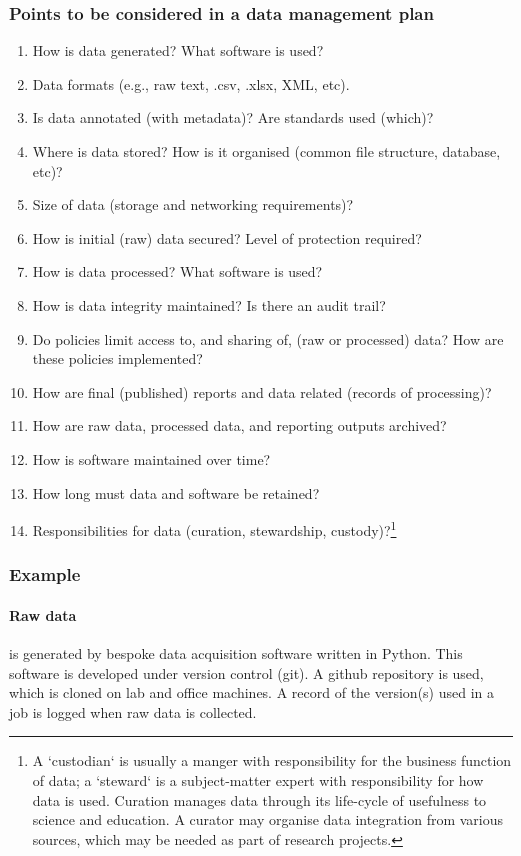 \subsubsection{Points to be considered in a data management plan}
\begin{enumerate}
 \item How is data generated? What software is used? 
 \item Data formats (e.g., raw text, .csv, .xlsx, XML, etc). 
 \item Is data annotated (with metadata)? Are standards used (which)? 
 \item Where is data stored? How is it organised (common file structure, database, etc)? 
 \item Size of data (storage and networking requirements)? 
 \item How is initial (raw) data secured? Level of protection required? 
 \item How is data processed? What software is used? 
 \item How is data integrity maintained? Is there an audit trail?
 \item Do policies limit access to, and sharing of, (raw or processed) data? How are these policies implemented?
 \item How are final (published) reports and data related (records of processing)?
 \item How are raw data, processed data, and reporting outputs archived? 
 \item How is software maintained over time?
 \item How long must data and software be retained?  
 \item Responsibilities for data (curation, stewardship, custody)?\footnote{A `custodian`  is usually a manger with responsibility for the business function of data; a `steward` is a subject-matter expert with responsibility for how data is used. Curation manages data through its life-cycle of usefulness to science and education. A curator may organise data integration from various sources, which may be needed as part of research projects. }
\end{enumerate}

\subsubsection{Example}
\paragraph{Raw data} is generated by bespoke data acquisition software written in Python. This software is developed under version control (git). A github repository is used, which is cloned on lab and office machines. A record of the version(s) used in a job is logged when raw data is collected.  

